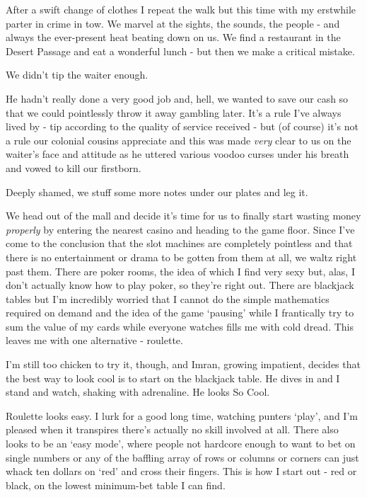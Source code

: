 \documentclass[a5paper,titlepage,11pt]{book}
\begin{document}
After a swift change of clothes I repeat the walk but this time with my erstwhile parter in crime in tow.  We marvel at the sights, the sounds, the people - and always the ever-present heat beating down on us.  We find a restaurant in the Desert Passage and eat a wonderful lunch - but then we make a critical mistake.

We didn't tip the waiter enough.

He hadn't really done a very good job and, hell, we wanted to save our cash so that we could pointlessly throw it away gambling later.  It's a rule I've always lived by - tip according to the quality of service received - but (of course) it's not a rule our colonial cousins appreciate and this was made \emph{very} clear to us on the waiter's face and attitude as he uttered various voodoo curses under his breath and vowed to kill our firstborn.

Deeply shamed, we stuff some more notes under our plates and leg it.

We head out of the mall and decide it's time for us to finally start wasting money \emph{properly} by entering the nearest casino and heading to the game floor.  Since I've come to the conclusion that the slot machines are completely pointless and that there is no entertainment or drama to be gotten from them at all, we waltz right past them.  There are poker rooms, the idea of which I find very sexy but, alas, I don't actually know how to play poker, so they're right out.  There are blackjack tables but I'm incredibly worried that I cannot do the simple mathematics required on demand and the idea of the game `pausing' while I frantically try to sum the value of my cards while everyone watches fills me with cold dread.  This leaves me with one alternative - roulette. 

I'm still too chicken to try it, though, and Imran, growing impatient, decides that the best way to look cool is to start on the blackjack table.  He dives in and I stand and watch, shaking with adrenaline.  He looks So Cool.

Roulette looks easy.  I lurk for a good long time, watching punters `play', and I'm pleased when it transpires there's actually no skill involved at all.  There also looks to be an `easy mode', where people not hardcore enough to want to bet on single numbers or any of the baffling array of rows or columns or corners can just whack ten dollars on `red' and cross their fingers.  This is how I start out - red or black, on the lowest minimum-bet table I can find.
\end{document}
